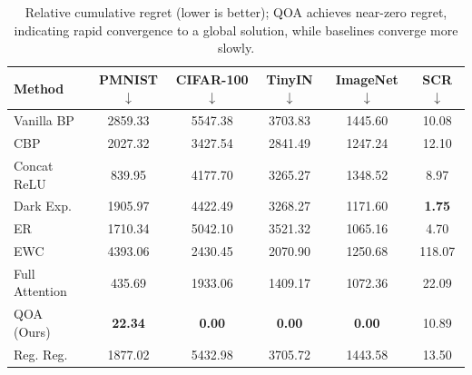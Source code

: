 \documentclass{article}
\begin{document}
\begin{table}[ht]

\caption{Relative cumulative regret (lower is better); QOA achieves near-zero regret, indicating rapid convergence to a global solution, while baselines converge more slowly.}
\label{tab:regret}

\centering
\footnotesize
\setlength{\tabcolsep}{2.5pt}

\begin{tabular}{lccccc}
\toprule
Method & PMNIST $\downarrow$ & CIFAR-100 $\downarrow$ & TinyIN $\downarrow$ & ImageNet $\downarrow$ & SCR $\downarrow$ \\
\midrule
Vanilla BP      & 2859.33 & 5547.38 & 3703.83 & 1445.60 & 10.08 \\
CBP             & 2027.32 & 3427.54 & 2841.49 & 1247.24 & 12.10 \\
Concat ReLU     & 839.95  & 4177.70 & 3265.27 & 1348.52 & 8.97 \\
Dark Exp.       & 1905.97 & 4422.49 & 3268.27 & 1171.60 & \textbf{1.75} \\
ER              & 1710.34 & 5042.10 & 3521.32 & 1065.16 & 4.70 \\
EWC             & 4393.06 & 2430.45 & 2070.90 & 1250.68 & 118.07 \\
Full Attention  & 435.69  & 1933.06 & 1409.17 & 1072.36 & 22.09 \\
QOA (Ours)      & \textbf{22.34} & \textbf{0.00} & \textbf{0.00} & \textbf{0.00} & 10.89 \\
Reg. Reg.       & 1877.02 & 5432.98 & 3705.72 & 1443.58 & 13.50 \\
\bottomrule
\end{tabular}

\end{table}
\end{document}
